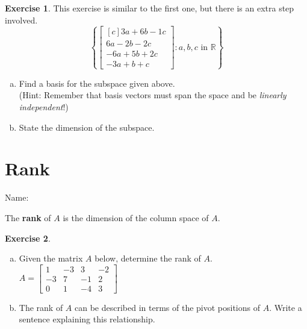 \documentclass[10pt]{book}
\newcommand{\boxcolor}{gray!30}
\newenvironment{boxdef}{\begin{mdframed}[backgroundcolor=\boxcolor,linewidth=0pt,nobreak=true]}{\end{mdframed}}
\theoremstyle{definition}
\newtheorem{exercise}{Exercise}[section]
\newcommand{\name}[1][2.5in]{\vspace{-2.3em}\hfill Name: \underline{\hspace{#1}}}
\newcommand{\R}{\mathbb{R}}
\begin{document}
\begin{exercise} %
	This exercise is similar to the first one, but there is an extra step involved.
	$$\left\{ \begin{bmatrix}[c] 3a+6b-1c \\ 6a-2b-2c \\ -6a+5b+2c \\ -3a+b+c \end{bmatrix} : a,b,c \text{ in } \R \right\}$$
	\begin{enumerate}[(a)]
		\item Find a basis for the subspace given above. \\
		(Hint: Remember that basis vectors must span the space and be \emph{linearly independent}!)
		\vfill
		\item State the dimension of the subspace.
		\vspace{2em}
	\end{enumerate}
\end{exercise}


\newpage


\section{Rank}
\name

\begin{boxdef}
	The \textbf{rank} of $A$ is the dimension of the column space of $A$.
\end{boxdef}

\begin{exercise} %
	\begin{enumerate}[(a)]
		\item Given the matrix $A$ below, determine the rank of $A$.\\
		$ A = \begin{bmatrix} 1&-3&3&-2 \\ -3&7&-1&2 \\ 0&1&-4&3 \end{bmatrix} $
		\vfill
		\item The rank of $A$ can be described in terms of the pivot positions of $A$. Write a sentence explaining this relationship.
		\vspace{.75in}
	\end{enumerate}
\end{exercise}
\end{document}
